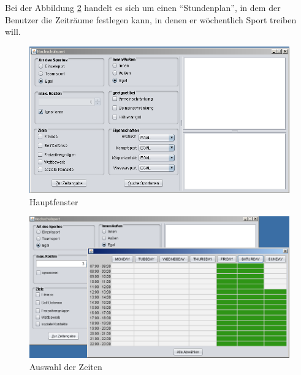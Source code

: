 Bei der Abbildung \ref{fig:Auswahl der Zeiten} handelt es sich um einen "`Stundenplan"', in dem der Benutzer die Zeitr\"aume festlegen kann, in denen er w\"ochentlich Sport treiben will. 



\begin{figure}[p]
\centering
\includegraphics[width=\textwidth]{images/gui.png}%
\caption{Hauptfenster}
\label{fig:Hauptfenster}
\end{figure}

\begin{figure}[p]
\centering
\includegraphics[width=\textwidth]{images/guizeit.png}%
\caption{Auswahl der Zeiten}
\label{fig:Auswahl der Zeiten}
\end{figure}
\newpage
